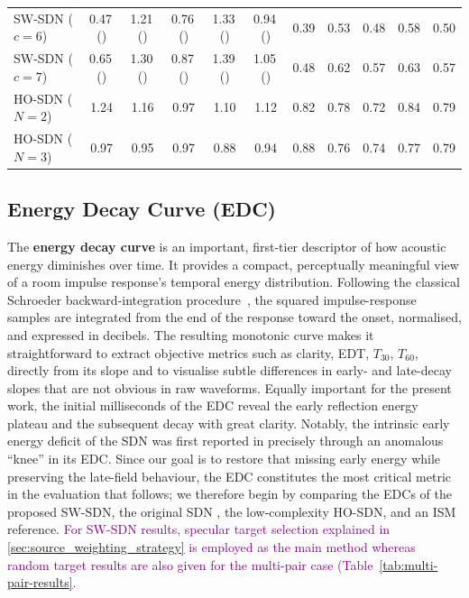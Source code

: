 \documentclass[journal]{IEEEtran}
\begin{document}
\begin{table}[tbh]
\begin{tabular}{l ccccc | ccccc}
        SW-SDN ($c=6$)
            & 0.47\,() & 1.21\,() & 0.76\,() & 1.33\,() & 0.94\,() 
            & 0.39 & 0.53 & 0.48 & 0.58 & 0.50 \\
            
        SW-SDN ($c=7$)
            & 0.65\,() & 1.30\,() & 0.87\,() & 1.39\,() & 1.05\,() 
            & 0.48 & 0.62 & 0.57 & 0.63 & 0.57 \\
        \midrule
        
        HO-SDN ($N=2$)
            & 1.24 & 1.16 & 0.97 & 1.10 & 1.12 
            & 0.82 & 0.78 & 0.72 & 0.84 & 0.79 \\
            
        HO-SDN ($N=3$)
            & 0.97 & 0.95 & 0.97 & 0.88 & 0.94 
            & 0.88 & 0.76 & 0.74 & 0.77 & 0.79 \\
            
        \bottomrule
    \end{tabular}
\end{table}

\subsection{Energy Decay Curve (EDC)}

The \textbf{energy decay curve} is an important, first-tier descriptor of how acoustic energy diminishes over time. It provides a compact, perceptually meaningful view of a room impulse response’s temporal energy distribution. 
Following the classical Schroeder backward-integration procedure~\cite{Schroeder1962}, the squared impulse-response samples are integrated from the end of the response toward the onset, normalised, and expressed in decibels. The resulting monotonic curve makes it straightforward to extract objective metrics such as clarity, EDT, $T_{30}$, $T_{60}$, directly from its slope and to visualise subtle differences in early- and late-decay slopes that are not obvious in raw waveforms.
Equally important for the present work, the initial milliseconds of the EDC reveal the early reflection energy plateau and the subsequent decay with great clarity.
Notably, the intrinsic early energy deficit of the SDN was first reported in \cite{SDNwaspaa} precisely through an anomalous “knee” in its EDC. Since our goal is to restore that missing early energy while preserving the late-field behaviour, the EDC constitutes the most critical metric in the evaluation that follows; we therefore begin by comparing the EDCs of the proposed SW-SDN, the original SDN \cite{SDNaes}, the low-complexity HO-SDN\cite{scerbo2022ho_sdn}, and an ISM reference. \textcolor{purple}{For SW-SDN results, specular target selection explained in \ref{sec:source_weighting_strategy} is employed as the main method whereas random target results are also given for the multi-pair case (Table~\ref{tab:multi-pair-results}.}
\end{document}
